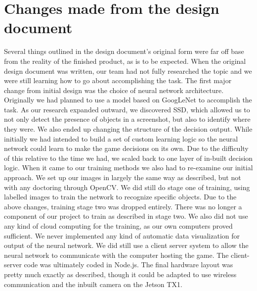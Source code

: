 \documentclass[onecolumn, draftclsnofoot,10pt, compsoc]{IEEEtran}
\begin{document}

%

\section{Changes made from the design document}
Several things outlined in the design document's original form were far off base from the reality of the finished product, as is to be expected.
When the original design document was written, our team had not fully researched the topic and we were still learning how to go about accomplishing the task. 
The first major change from initial design was the choice of neural network architecture. 
Originally we had planned to use a model based on GoogLeNet to accomplish the task.
As our research expanded outward, we discovered SSD, which allowed us to not only detect the presence of objects in a screenshot, but also to identify where they were.
We also ended up changing the structure of the decision output.
While initially we had intended to build a set of custom learning logic so the neural network could learn to make the game decisions on its own.
Due to the difficulty of this relative to the time we had, we scaled back to one layer of in-built decision logic.
\newline\newline
When it came to our training methods we also had to re-examine our initial approach.
We set up our images in largely the same way as described, but not with any doctoring through OpenCV.
We did still do stage one of training, using labelled images to train the network to recognize specific objects.
Due to the above changes, training stage two was dropped entirely.
There was no longer a component of our project to train as described in stage two.
We also did not use any kind of cloud computing for the training, as our own computers proved sufficient.
\newline\newline
We never implemented any kind of automatic data visualization for output of the neural network.
We did still use a client server system to allow the neural network to communicate with the computer hosting the game.
The client-server code was ultimately coded in Node.js.
The final hardware layout was pretty much exactly as described, though it could be adapted to use wireless communication and the inbuilt camera on the Jetson TX1.
\end{document}
